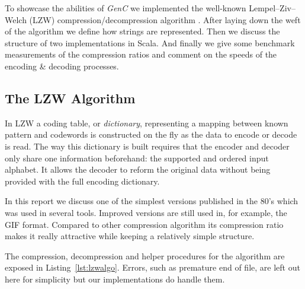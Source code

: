 \documentclass[a4paper,twoside]{article}
\newcommand{\GenC}{\emph{GenC}\xspace}
\newcommand{\RefCode}[1]{Listing~\ref{#1}}
\begin{document}

To showcase the abilities of \GenC we implemented the well-known
Lempel–Ziv–Welch (LZW) compression/decompression algorithm \cite{welch1985high}.
After laying down the weft of the algorithm we define how strings are
represented. Then we discuss the structure of two implementations in Scala. And
finally we give some benchmark measurements of the compression ratios and
comment on the speeds of the encoding \& decoding processes.

\subsection{The LZW Algorithm}

In LZW a coding table, or \emph{dictionary}, representing a mapping between
known pattern and codewords is constructed on the fly as the data to encode or
decode is read. The way this dictionary is built requires that the encoder and
decoder only share one information beforehand: the supported and ordered input
alphabet. It allows the decoder to reform the original data without being
provided with the full encoding dictionary.

In this report we discuss one of the simplest versions published in the 80's
which was used in several tools. Improved versions are still used in, for
example, the GIF format. Compared to other compression algorithm its compression
ratio makes it really attractive while keeping a relatively simple structure.

The compression, decompression and helper procedures for the algorithm are
exposed in \RefCode{lst:lzwalgo}. Errors, such as premature end of file, are
left out here for simplicity but our implementations do handle them.
\end{document}
